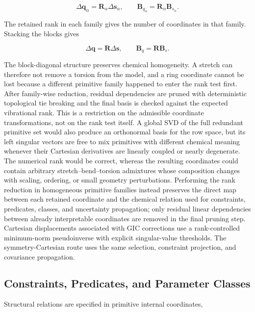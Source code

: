 \documentclass[aip,jcp,reprint,longbibliography,floatfix]{revtex4-2}
\begin{document}
\begin{equation}
\Delta \mathbf{q}_\alpha
=
\mathbf{R}_\alpha
\Delta \mathbf{s}_\alpha ,
\qquad
\mathbf{B}_{q_\alpha}
=
\mathbf{R}_\alpha
\mathbf{B}_{s_\alpha}.
\end{equation}

The retained rank in each family gives the number of coordinates in that
family. Stacking the blocks gives

\begin{equation}
\Delta \mathbf{q}
=
\mathbf{R}
\Delta \mathbf{s},
\qquad
\mathbf{B}_{q}
=
\mathbf{R}
\mathbf{B}_s .
\end{equation}

The block-diagonal structure preserves chemical homogeneity. A stretch can
therefore not remove a torsion from the model, and a ring coordinate cannot be
lost because a different primitive family happened to enter the rank test
first. After family-wise reduction, residual dependencies are pruned with
deterministic topological tie breaking and the final basis is checked against
the expected vibrational rank.
This is a restriction on the admissible coordinate transformations, not on the
rank test itself. A global SVD of the full redundant primitive set would also
produce an orthonormal basis for the row space, but its left singular vectors
are free to mix primitives with different chemical meaning whenever their
Cartesian derivatives are linearly coupled or nearly degenerate. The numerical
rank would be correct, whereas the resulting coordinates could contain
arbitrary stretch--bend--torsion admixtures whose composition changes with
scaling, ordering, or small geometry perturbations. Performing the rank
reduction in homogeneous primitive families instead preserves the direct map
between each retained coordinate and the chemical relation used for
constraints, predicates, classes, and uncertainty propagation; only residual
linear dependencies between already interpretable coordinates are removed in
the final pruning step.
Cartesian displacements associated with GIC corrections use a rank-controlled
minimum-norm pseudoinverse with explicit singular-value thresholds. The
symmetry-Cartesian route uses the same selection, constraint projection, and
covariance propagation.


\subsection{Constraints, Predicates, and Parameter Classes}

Structural relations are specified in primitive internal coordinates,
\end{document}
